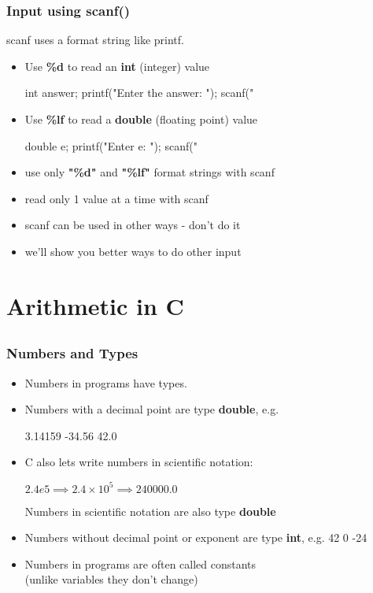 \begin{frame}[fragile=singleslide]
\frametitle{Input using scanf()}

scanf uses a format string like printf.

\begin{itemize}
\item Use {\bf \%d} to read an {\bf int} (integer) value
\begin{C}
int answer;
printf("Enter the answer: ");
scanf("%
\end{C}
\item Use {\bf \%lf} to read a {\bf double} (floating point) value
\begin{C}
double e;
printf("Enter e: ");
scanf("%
\end{C}
\item use only {\bf "\%d"} and  {\bf "\%lf"} format strings with scanf
\item read only 1 value at a time with scanf
\item scanf can be used in other ways - don't do it 
\item we'll show you better ways to do other input 
\end{itemize}
\end{frame}




\section{Arithmetic in C}
\subsection{}

\begin{frame}
\frametitle{Numbers and Types}

\begin{itemize}
\item

Numbers in programs have types.

\item

Numbers with a decimal point are type {\bf double}, e.g.

3.14159 -34.56 42.0

\item

C also lets write numbers in scientific notation:

$2.4e5 \implies 2.4\times10^5 \implies  240000.0$

Numbers in scientific notation are also type {\bf double}

\item

Numbers without decimal point or exponent  are type {\bf int}, e.g.
42 0 -24 

\item

Numbers in programs are often called constants \\
(unlike variables they don't change)

\end{itemize}
\end{frame}

